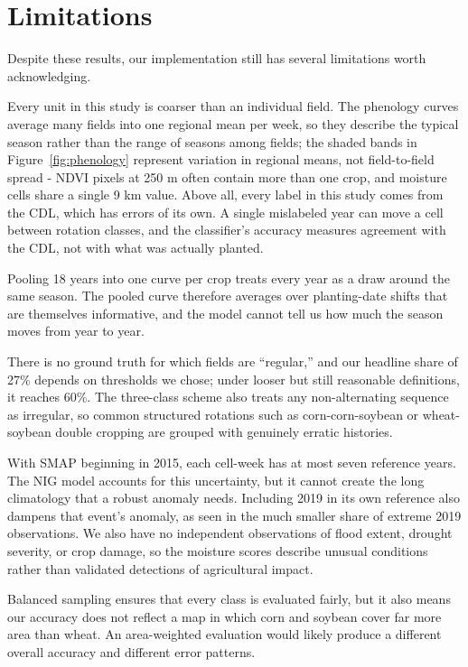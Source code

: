 \documentclass[10pt,letterpaper]{article}
\begin{document}
\section{Limitations}\label{sec:limits}

Despite these results, our implementation still has several limitations worth acknowledging.

Every unit in this study is coarser than an individual field. The phenology curves average many fields into one regional mean per week, so they describe the typical season rather than the range of seasons among fields; the shaded bands in Figure~\ref{fig:phenology} represent variation in regional means, not field-to-field spread - NDVI pixels at 250 m often contain more than one crop, and moisture cells share a single 9 km value. Above all, every label in this study comes from the CDL, which has errors of its own. A single mislabeled year can move a cell between rotation classes, and the classifier's accuracy measures agreement with the CDL, not with what was actually planted.

Pooling 18 years into one curve per crop treats every year as a draw around the same season. The pooled curve therefore averages over planting-date shifts that are themselves informative, and the model cannot tell us how much the season moves from year to year.

There is no ground truth for which fields are ``regular,'' and our headline share of 27\% depends on thresholds we chose; under looser but still reasonable definitions, it reaches 60\%. The three-class scheme also treats any non-alternating sequence as irregular, so common structured rotations such as corn-corn-soybean or wheat-soybean double cropping are grouped with genuinely erratic histories.

With SMAP beginning in 2015, each cell-week has at most seven reference years. The NIG model accounts for this uncertainty, but it cannot create the long climatology that a robust anomaly needs. Including 2019 in its own reference also dampens that event's anomaly, as seen in the much smaller share of extreme 2019 observations. We also have no independent observations of flood extent, drought severity, or crop damage, so the moisture scores describe unusual conditions rather than validated detections of agricultural impact.

Balanced sampling ensures that every class is evaluated fairly, but it also means our accuracy does not reflect a map in which corn and soybean cover far more area than wheat. An area-weighted evaluation would likely produce a different overall accuracy and different error patterns.
\end{document}
